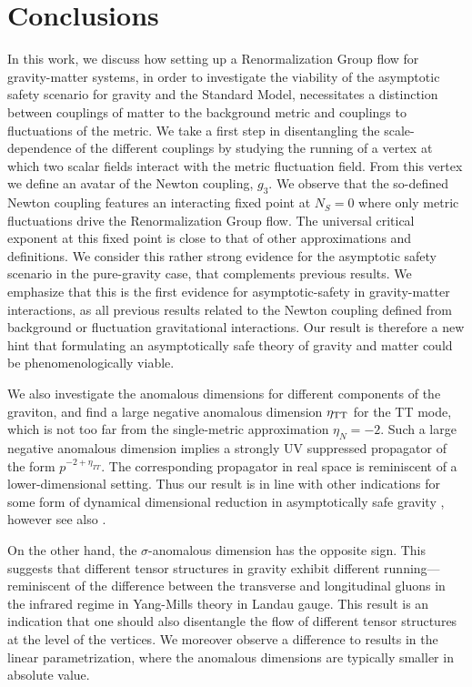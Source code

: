 \documentclass[11pt]{book} %
\begin{document}
%
\section{Conclusions}
%
In this work, we discuss how setting up a Renormalization Group flow for gravity-matter systems,
in order to investigate the viability of the asymptotic safety scenario for gravity and the Standard Model,
necessitates a distinction between couplings of matter to the background metric and couplings to
fluctuations of the metric.
We take a first step in disentangling the scale-dependence of the different couplings by studying
the running of a vertex at which two scalar fields interact with the metric fluctuation field.
From this vertex we define an avatar of the Newton coupling, $g_3$.
We observe that the so-defined Newton coupling features an interacting fixed point at $N_S=0$
where only metric fluctuations drive the Renormalization Group flow.
The universal critical exponent at this fixed point is close to that of other approximations and definitions.
We consider this rather strong evidence for the asymptotic safety scenario  in the pure-gravity case,
that complements previous results.
We emphasize that this is the first evidence for asymptotic-safety in gravity-matter interactions,
as all previous results related to the Newton coupling defined from background or fluctuation
gravitational interactions.
Our result is therefore a new hint that formulating an asymptotically safe theory of gravity
and matter could be phenomenologically viable.\newline

We also investigate the anomalous dimensions for different components of the graviton,
and find a large negative anomalous dimension $\eta_{\rm TT}$ for the TT mode,
which is not too far from the single-metric approximation $\eta_N=-2$.
Such a large negative anomalous dimension implies a strongly UV suppressed propagator of the form
$p^{-2+\eta_{TT}}$. The corresponding propagator in real space is reminiscent of a lower-dimensional setting.
Thus our result is in line with other indications for some form of dynamical dimensional reduction
in asymptotically safe gravity
\cite{Lauscher:2001ya, Lauscher:2005qz, Reuter:2011ah, Rechenberger:2012pm, Calcagni:2013vsa},
however see also \cite{DOdorico:2015jtl}.

On the other hand, the  $\sigma$-anomalous dimension has the opposite sign.
This suggests that different tensor structures in gravity exhibit different running---reminiscent
of the difference between the transverse and longitudinal gluons in the infrared regime
in Yang-Mills theory in Landau gauge.
This result is an indication that one should also disentangle the flow of different tensor structures
at the level of the vertices.
We moreover observe a difference to results in the linear parametrization,
where the anomalous dimensions are typically smaller in  absolute value.
\end{document}

